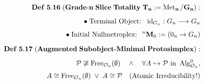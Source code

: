 \documentclass[preview]{standalone}
\begin{document}
\begin{align*}
\special{dvisvgm:raw <g id='unique000'>}\mathbf{Def\;5.16\;(Grade\text{-}n\;Slice\;Totality\;T_n := \operatorname{Met}_n/G_n):}\\[5pt]\bullet\;\text{Terminal Object: }\;\operatorname{id}_{G_n}: G_n \longrightarrow G_n\\[4pt]\bullet\;\text{Initial Nullmetroplex: }\;{}^n\mathbf{M}_0 := (0_n \to G_n)\\[6pt]\mathbf{Def\;5.17\;(Augmented\;Subobject\text{-}Minimal\;Protosimplex):}\\[4pt]\mathcal{P} \not\cong \operatorname{Free}_{\mathcal{O}_n}(\emptyset) \quad\wedge\quad \forall A \hookrightarrow \mathcal{P}\text{ in }\operatorname{Alg}_{\mathcal{O}_n}^0,\\[3pt]A \cong \operatorname{Free}_{\mathcal{O}_n}(\emptyset) \;\vee\; A \cong \mathcal{P}\quad(\text{Atomic Irreducibility!})\special{dvisvgm:raw </g>}
\end{align*}
\end{document}
